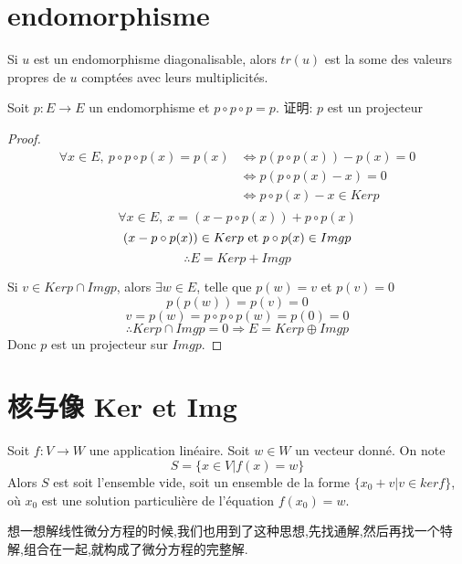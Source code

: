 \documentclass{book}
\begin{document}
\section{endomorphisme}
Si $u$ est un endomorphisme diagonalisable, alors $tr(u)$ est la some des valeurs propres de $u$ compt\'ees avec leurs multiplicit\'es.

\begin{example}
\end{example}
Soit $p: E \rightarrow E$ un endomorphisme et $p \circ p \circ p = p$.
证明: $p$ est un projecteur
\begin{proof}
$$
\begin{aligned}
\forall x \in E,~ p \circ p \circ p(x) = p(x)
& \Leftrightarrow p(p \circ p(x)) - p(x) = 0 \\
& \Leftrightarrow p(p \circ p(x) - x) = 0 \\
& \Leftrightarrow p \circ p(x) - x \in Ker p \\
\end{aligned}
$$
$$\forall x \in E,~ x = (x - p \circ p(x)) + p \circ p(x)$$
$$(x - p \circ p(x)) \in Ker p \textrm{\ et } p \circ p(x) \in Img p$$
$$\therefore E = Ker p + Img p$$

Si $v \in Ker p \cap Img p$, alors $\exists w \in E$, telle que $p(w) = v$ et $p(v) = 0$
$$p(p(w)) = p(v) = 0$$
$$v = p(w) = p \circ p \circ p(w) = p(0) = 0$$
$$\therefore Ker p \cap Img p = {0} \Rightarrow E = Ker p \oplus Img p$$
Donc $p$ est un projecteur sur $Img p$.
\end{proof}

\section{核与像 Ker et Img}
\begin{theorem}
Soit $f:V \rightarrow W$ une application lin\'eaire. Soit $w \in W$ un vecteur donn\'e. On note
$$ S=\{x \in V|f(x)=w\} $$
Alors $S$ est soit l'ensemble vide, soit un ensemble de la forme $\{x_0+v|v \in ker f\}$, o\`u $x_0$ est une solution particuli\`ere de l'\'equation $f(x_0)=w$.
\end{theorem}
\begin{note}
想一想解线性微分方程的时候,我们也用到了这种思想,先找通解,然后再找一个特解,组合在一起,就构成了微分方程的完整解.
\end{note}
\end{document}
